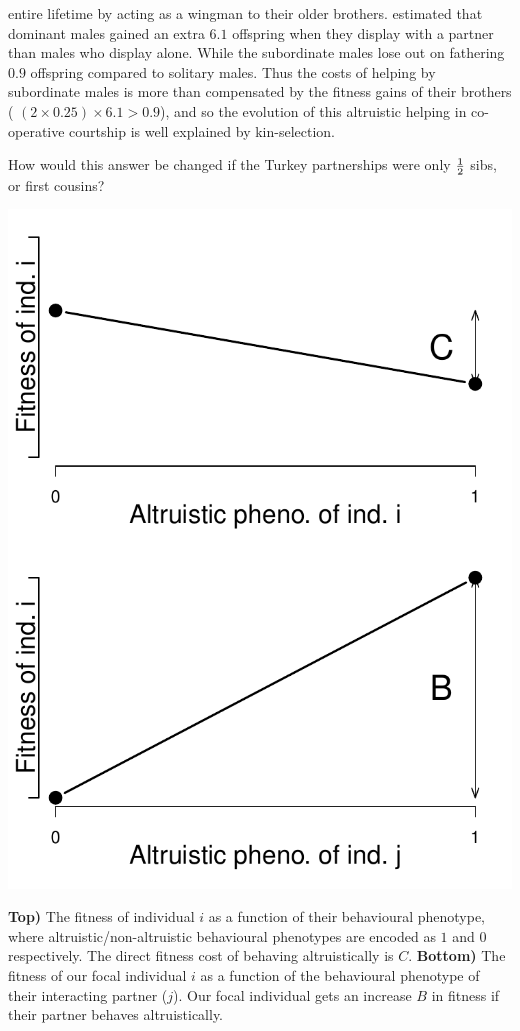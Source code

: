 entire lifetime by acting as a wingman to their older 
brothers. \citet{krakauer2005kin} estimated that dominant males gained
an extra $6.1$ offspring when they display with a partner than males
who display alone. While the subordinate males lose out on fathering $0.9$
offspring compared to solitary males. Thus the costs of helping by
subordinate males is more than compensated by the fitness gains of
their brothers ( $ (2 \times 0.25)  \times 6.1 > 0.9$), and so the
evolution of this  altruistic  helping in co-operative courtship is
well explained by kin-selection.
\begin{question}
How would this answer be changed if the Turkey partnerships were only
$\nicefrac{1}{2}$ sibs, or first cousins?
\end{question}


\begin{marginfigure}
\begin{center}
\includegraphics[width= \textwidth]{figures/Response_to_sel/Hamiltons_rule_B_C.pdf}
\end{center}
\caption{{\bf Top)} The fitness of individual $i$ as a function of their behavioural phenotype, where altruistic/non-altruistic behavioural phenotypes are encoded as $1$ and $0$ respectively. The direct fitness cost of behaving altruistically is $C$. {\bf Bottom)} The fitness of our focal individual $i$ as a function of the behavioural phenotype of their interacting partner ($j$). Our focal individual gets an increase $B$ in fitness if their partner behaves altruistically.} \label{fig:Hamilton_B_C}
\end{marginfigure}


